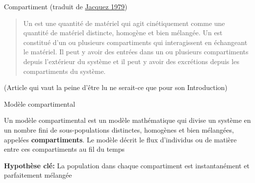 \documentclass[aspectratio=169]{beamer}\usepackage[]{graphicx}\usepackage[]{xcolor}
\begin{document}
\begin{frame}{Compartiment (traduit de \href{https://doi-org.uml.idm.oclc.org/10.1016/B978-0-12-434180-7.50021-8}{Jacquez 1979})}
\nocite{jacquez1979compartmental}

\begin{quote}
  Un  est une quantité de matériel qui agit cinétiquement comme une quantité de matériel distincte, homogène et bien mélangée. Un  est constitué d'un ou plusieurs compartiments qui interagissent en échangeant le matériel. Il peut y avoir des entrées dans un ou plusieurs compartiments depuis l'extérieur du système et il peut y avoir des excrétions depuis les compartiments du système.   
\end{quote}
\vfill
(Article qui vaut la peine d'être lu ne serait-ce que pour son Introduction)
\end{frame}

\begin{frame}{Modèle compartimental}
    \begin{definition}
        Un modèle compartimental est un modèle mathématique qui divise un système en un nombre fini de sous-populations distinctes, homogènes et bien mélangées, appelées \textbf{compartiments}. Le modèle décrit le flux d'individus ou de matière entre ces compartiments au fil du temps
    \end{definition}
    \vfill
    \begin{center}
    \end{center}
    \vfill
    \textbf{Hypothèse clé:} La population dans chaque compartiment est instantanément et parfaitement mélangée
\end{frame}
\end{document}
